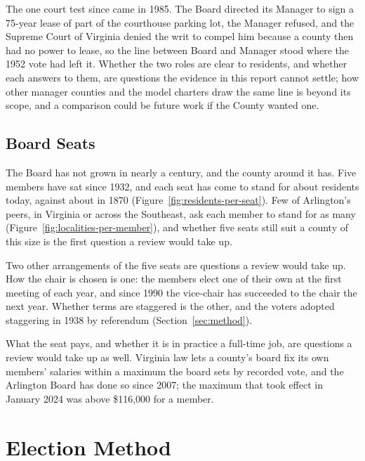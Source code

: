 The one court test since came in 1985. The Board directed its Manager to sign a
75-year lease of part of the courthouse parking lot, the Manager refused, and the
Supreme Court of Virginia denied the writ to compel him because a county then had
no power to lease, so the line between Board and Manager stood where the 1952 vote
had left it.\autocite{brownvarlington1985} Whether the two roles are clear to
residents, and whether each answers to them, are questions the evidence in this
report cannot settle; how other manager counties and the model charters draw the
same line is beyond its scope, and a comparison could be future work if the
County wanted one.

\subsection{Board Seats}

The Board has not grown in nearly a century, and the county around it has. Five
members have sat since 1932, and each seat has come to stand for about
\residentsPerSeatTwoThousandTwenty{} residents today, against about
\residentsPerSeatEighteenSeventy{} in 1870
(Figure~\ref{fig:residents-per-seat}). Few of Arlington's peers, in Virginia or
across the Southeast, ask each member to stand for as many
(Figure~\ref{fig:localities-per-member}), and whether five seats still suit a
county of this size is the first question a review would take up.

Two other arrangements of the five seats are questions a review would take up.
How the chair is chosen is one: the members elect one of their own at the first
meeting of each year, and since 1990 the vice-chair has succeeded to the chair the
next year.\autocite{arlingtonva2026members,arlnow2026chair} Whether terms are
staggered is the other, and the voters adopted staggering in 1938 by
referendum (Section~\ref{sec:method}).

What the seat pays, and whether it is in practice a full-time job, are questions
a review would take up as well. Virginia law lets a county's board fix its own
members' salaries within a maximum the board sets by recorded
vote,\autocite{vacode1514142} and the Arlington Board has done so since 2007; the
maximum that took effect in January 2024 was above \$116,000 for a
member.\autocite{arlingtoncb2023salarycap}

\section{Election Method}

